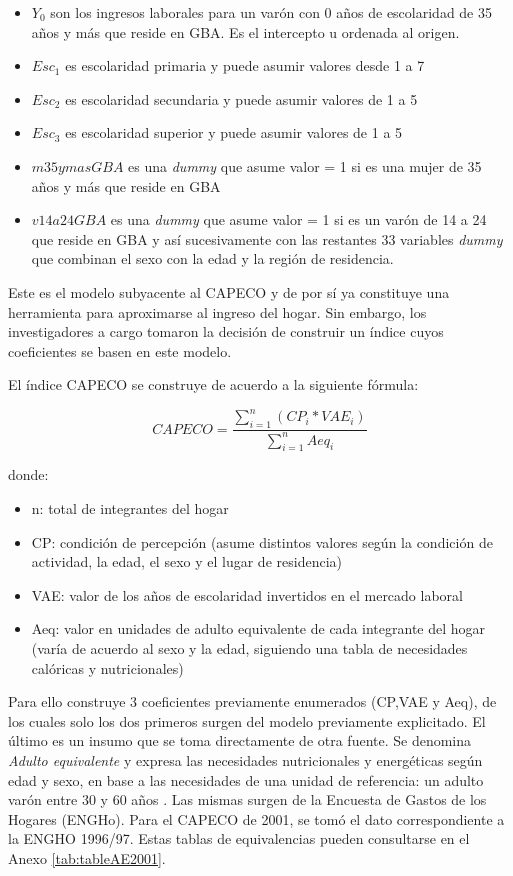 \begin{itemize}
	\item $Y_0$ son los ingresos laborales para un varón con 0 años de escolaridad de 35 años y más que reside en GBA. Es el intercepto u ordenada al origen.
	\item $Esc_1$ es escolaridad primaria y puede asumir valores desde 1 a 7
	\item $Esc_2$ es escolaridad secundaria y puede asumir valores de 1 a 5
	\item $Esc_3$ es escolaridad superior y puede asumir valores de 1 a 5
	\item $m35ymasGBA$ es una \textit{dummy} que asume valor = 1 si es una mujer de 35 años y más que reside en GBA
	\item $v14a24GBA$ es una \textit{dummy} que asume valor = 1 si es un varón de 14 a 24 que reside en GBA y así sucesivamente con las restantes 33 variables \textit{dummy} que combinan el sexo con la edad y la región de residencia.
\end{itemize}

Este es el modelo subyacente al CAPECO y de por sí ya constituye una herramienta para aproximarse al ingreso del hogar. Sin embargo, los investigadores a cargo tomaron la decisión de construir un índice cuyos coeficientes se basen en este modelo. 

El índice CAPECO se construye de acuerdo a la siguiente fórmula:

$$ CAPECO = \frac{\displaystyle\sum_{i=1}^{n}(CP_i * VAE_i)}{\displaystyle\sum_{i=1}^{n}Aeq_i} $$

donde:
\begin{itemize}
	\item n: total de integrantes del hogar
	\item CP: condición de percepción (asume distintos valores según la condición de actividad, la edad, el sexo y el lugar de residencia)
	\item VAE: valor de los años de escolaridad invertidos en el mercado laboral
	\item Aeq: valor en unidades de adulto equivalente de cada integrante del hogar (varía de acuerdo al sexo y la edad, siguiendo una tabla de necesidades calóricas y nutricionales)
\end{itemize}


Para ello construye 3 coeficientes previamente enumerados (CP,VAE y Aeq), de los cuales solo los dos primeros surgen del modelo previamente explicitado. El último es un insumo que se toma directamente de otra fuente. Se denomina \textit{Adulto equivalente} y expresa las necesidades nutricionales y energéticas según edad y sexo, en base a las necesidades de una unidad de referencia: un adulto varón entre 30 y 60 años \cite{indec2016b}. Las mismas surgen de la Encuesta de Gastos de los Hogares (ENGHo). Para el CAPECO de 2001, se tomó el dato correspondiente a la ENGHO 1996/97. Estas tablas de equivalencias pueden consultarse en el Anexo \ref{tab:tableAE2001}.


